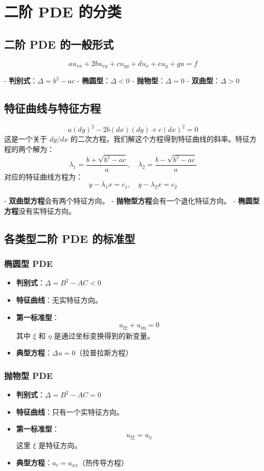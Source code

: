\section{二阶 PDE 的分类}

\subsection{二阶 PDE 的一般形式}
\[
a u_{xx} + 2b u_{xy} + c u_{yy} + d u_x + e u_y + g u = f
\]

- \textbf{判别式}：$\Delta = b^2 - ac$
  - \textbf{椭圆型}：$\Delta < 0$
  - \textbf{抛物型}：$\Delta = 0$
  - \textbf{双曲型}：$\Delta > 0$

\subsection{特征曲线与特征方程}

\[
a (dy)^2 - 2b (dx)(dy) + c (dx)^2 = 0
\]
这是一个关于 $dy/dx$ 的二次方程。我们解这个方程得到特征曲线的斜率。特征方程的两个解为：
\[
\lambda_1 = \frac{b + \sqrt{b^2 - ac}}{a}, \quad \lambda_2 = \frac{b - \sqrt{b^2 - ac}}{a}
\]
对应的特征曲线方程为：
\[
y - \lambda_1 x = c_1, \quad y - \lambda_2 x = c_2
\]

- \textbf{双曲型方程}会有两个特征方向。
- \textbf{抛物型方程}会有一个退化特征方向。
- \textbf{椭圆型方程}没有实特征方向。

\subsection{各类型二阶 PDE 的标准型}

\subsubsection{椭圆型 PDE}
\begin{itemize}
    \item \textbf{判别式}：$\Delta = B^2 - AC < 0$  
    \item \textbf{特征曲线}：无实特征方向。  
    \item \textbf{第一标准型}：
    \[
    u_{\xi \xi} + u_{\eta \eta} = 0
    \]
    其中 $\xi$ 和 $\eta$ 是通过坐标变换得到的新变量。
    \item \textbf{典型方程}：$\Delta u = 0$（拉普拉斯方程）
\end{itemize}

\subsubsection{抛物型 PDE}
\begin{itemize}
    \item \textbf{判别式}：$\Delta = B^2 - AC = 0$  
    \item \textbf{特征曲线}：只有一个实特征方向。  
    \item \textbf{第一标准型}：
    \[
    u_{\xi \xi} = u_{\eta}
    \]
    这里 $\xi$ 是特征方向。
    \item \textbf{典型方程}：$u_t = u_{xx}$（热传导方程）
\end{itemize}

